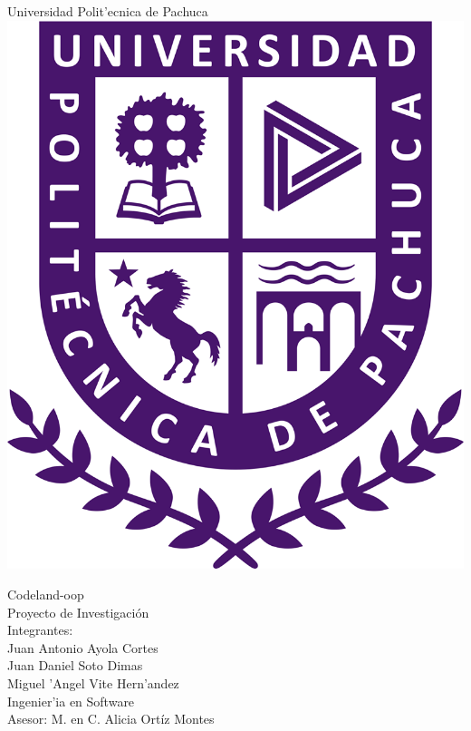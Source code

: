 \begin{titlepage}
	\begin{center}
		\sc \LARGE Universidad Polit'ecnica de Pachuca\\
		\bigskip
		\includegraphics[scale=0.2]{img/logo.png}
	\end{center}
	\bigskip
	\begin{center}
		\huge{Codeland-oop\\}
		\vspace*{1cm}
		\vspace*{0.5cm}
		\sc \LARGE Proyecto de Investigación\\
		\vspace*{0.5cm}
		\sc \LARGE Integrantes: \\
	    \sc \Large Juan Antonio Ayola Cortes \\
	    \sc \Large Juan Daniel Soto Dimas \\
		\sc \Large Miguel 'Angel Vite Hern'andez \\
		\vfill
		\sc Ingenier'ia en Software \\
		\sc Asesor: M. en C. Alicia Ortíz Montes\\
	\end{center}
\end{titlepage}